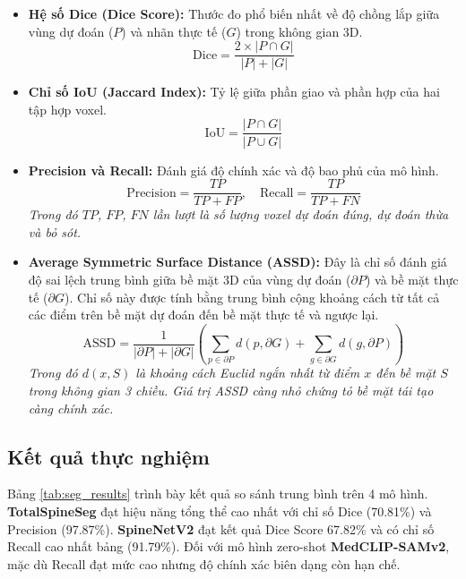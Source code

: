 \begin{itemize}
    \item \textbf{Hệ số Dice (Dice Score):} 
    Thước đo phổ biến nhất về độ chồng lắp giữa vùng dự đoán ($P$) và nhãn thực tế ($G$) trong không gian 3D.
    \begin{equation}
        \text{Dice} = \frac{2 \times |P \cap G|}{|P| + |G|}
    \end{equation}

    \item \textbf{Chỉ số IoU (Jaccard Index):}
    Tỷ lệ giữa phần giao và phần hợp của hai tập hợp voxel.
    \begin{equation}
        \text{IoU} = \frac{|P \cap G|}{|P \cup G|}
    \end{equation}

    \item \textbf{Precision và Recall:}
    Đánh giá độ chính xác và độ bao phủ của mô hình.
    \begin{equation}
        \text{Precision} = \frac{TP}{TP + FP}, \quad \text{Recall} = \frac{TP}{TP + FN}
    \end{equation}
    \textit{Trong đó $TP$, $FP$, $FN$ lần lượt là số lượng voxel dự đoán đúng, dự đoán thừa và bỏ sót.}

    \item \textbf{Average Symmetric Surface Distance (ASSD):}
    Đây là chỉ số đánh giá độ sai lệch trung bình giữa bề mặt 3D của vùng dự đoán ($\partial P$) và bề mặt thực tế ($\partial G$). Chỉ số này được tính bằng trung bình cộng khoảng cách từ tất cả các điểm trên bề mặt dự đoán đến bề mặt thực tế và ngược lại.
    \begin{equation}
        \text{ASSD} = \frac{1}{|\partial P| + |\partial G|} \left( \sum_{p \in \partial P} d(p, \partial G) + \sum_{g \in \partial G} d(g, \partial P) \right)
    \end{equation}
    \textit{Trong đó $d(x, S)$ là khoảng cách Euclid ngắn nhất từ điểm $x$ đến bề mặt $S$ trong không gian 3 chiều. Giá trị ASSD càng nhỏ chứng tỏ bề mặt tái tạo càng chính xác.}
\end{itemize}

\subsection{Kết quả thực nghiệm}
Bảng \ref{tab:seg_results} trình bày kết quả so sánh trung bình trên 4 mô hình. \textbf{TotalSpineSeg} đạt hiệu năng tổng thể cao nhất với chỉ số Dice (70.81\%) và Precision (97.87\%). \textbf{SpineNetV2} đạt kết quả Dice Score 67.82\% và có chỉ số Recall cao nhất bảng (91.79\%). Đối với mô hình zero-shot \textbf{MedCLIP-SAMv2}, mặc dù Recall đạt mức cao nhưng độ chính xác biên dạng còn hạn chế.


